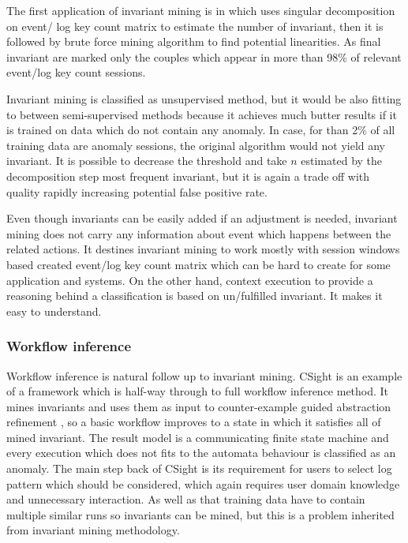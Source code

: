 The first application of invariant mining is in \cite{lou2010mining} which uses singular decomposition on event/ log key count matrix to estimate the number of invariant, then it is followed by brute force mining algorithm to find potential linearities. As final invariant are marked only the couples which appear in more than 98\% of relevant event/log key count sessions.

Invariant mining is classified as unsupervised method, but it would be also fitting to between semi-supervised methods because it achieves much butter results if it is trained on data which do not contain any anomaly. In case, for than 2\%  of all training data are anomaly sessions, the original algorithm would not yield any invariant. It is possible to decrease the threshold and take $n$ estimated by the decomposition step most frequent invariant, but it is again a trade off with quality rapidly increasing potential false positive rate.

Even though invariants can be easily added if an adjustment is needed, invariant mining does not carry any information about event which happens between the related actions. It destines invariant mining to work mostly with session windows based created event/log key count matrix which can be hard to create for some application and systems. On the other hand, context execution to provide a reasoning behind a classification is based on un/fulfilled invariant. It makes it easy to understand.

\subsubsection{Workflow inference}

Workflow inference is natural follow up to invariant mining. CSight \cite{beschastnikh2014inferring} is an example of a framework which is half-way through to full workflow inference method. It mines invariants and uses them as input to counter-example guided abstraction refinement \cite{clarke2000counterexample}, so a basic workflow improves to a state in which it satisfies all of mined invariant. The result model is a communicating finite state machine \cite{brand1983communicating} and every execution which does not fits to the automata behaviour is classified as an anomaly.
The main step back of CSight is its requirement for users to select log pattern which should be considered, which again requires user domain knowledge and unnecessary interaction. As well as that training data have to contain multiple similar runs so invariants can be mined, but this is a problem inherited from invariant mining methodology.

